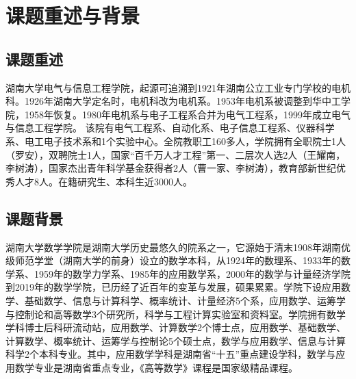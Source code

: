 \section{课题重述与背景}
\subsection{课题重述}
湖南大学电气与信息工程学院，起源可追溯到1921年湖南公立工业专门学校的电机科。1926年湖南大学定名时，电机科改为电机系。1953年电机系被调整到华中工学院，1958年恢复。1980年电机系与电子工程系合并为电气工程系，1999年成立电气与信息工程学院。 该院有电气工程系、自动化系、电子信息工程系、仪器科学系、电工电子技术系和1个实验中心。全院教职工160多人，学院拥有全职院士1人（罗安），双聘院士1人，国家“百千万人才工程”第一、二层次人选2人（王耀南，李树涛），国家杰出青年科学基金获得者2人（曹一家、李树涛），教育部新世纪优秀人才8人。在籍研究生、本科生近3000人。
\subsection{课题背景}
湖南大学数学学院是湖南大学历史最悠久的院系之一，它源始于清末1908年湖南优级师范学堂（湖南大学的前身）设立的数学本科，从1924年的数理系、1933年的数学系、1959年的数学力学系、1985年的应用数学系，2000年的数学与计量经济学院到2019年的数学学院，已历经了近百年的变革与发展，硕果累累。学院下设应用数学、基础数学、信息与计算科学、概率统计、计量经济5个系，应用数学、运筹学与控制论和高等数学3个研究所，科学与工程计算实验室和资料室。学院拥有数学学科博士后科研流动站，应用数学、计算数学2个博士点，应用数学、基础数学、计算数学、概率统计、运筹学与控制论5个硕士点，数学与应用数学、信息与计算科学2个本科专业。其中，应用数学学科是湖南省“十五”重点建设学科，数学与应用数学专业是湖南省重点专业，《高等数学》课程是国家级精品课程。

